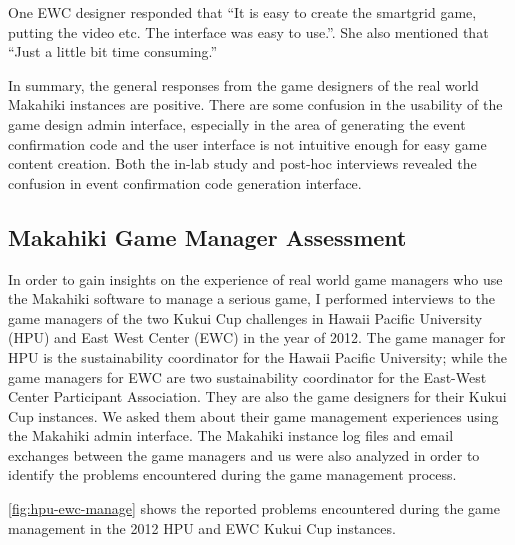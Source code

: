 One EWC designer responded that ``It is easy to create the smartgrid game, putting the video etc. The interface was easy to use.''. She also mentioned that ``Just a little bit time consuming.''

In summary, the general responses from the game designers of the real world Makahiki instances are positive. There are some confusion in the usability of the game design admin interface, especially in the area of generating the event confirmation code and the user interface is not intuitive enough for easy game content creation. Both the in-lab study and post-hoc interviews revealed the confusion in event confirmation code generation interface.

\subsection{Makahiki Game Manager Assessment}

In order to gain insights on the experience of real world game managers who use the Makahiki software to manage a serious game, I performed interviews to the game managers of the two Kukui Cup challenges in Hawaii Pacific University (HPU) and East West Center (EWC) in the year of 2012. The game manager for HPU is the sustainability coordinator for the Hawaii Pacific University; while the game managers for EWC are two sustainability coordinator for the East-West Center Participant Association. They are also the game designers for their Kukui Cup instances. We asked them about their game management experiences using the Makahiki admin
interface. The Makahiki instance log files and email exchanges between the game managers and us were also analyzed in order to identify the problems encountered during the game management process.

\autoref{fig:hpu-ewc-manage} shows the reported problems encountered during the game management in the 2012 HPU and  EWC Kukui Cup instances. 

